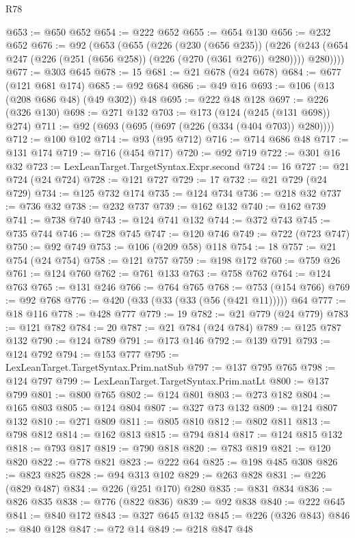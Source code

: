 \begin{lexlean}{R78}
\begin{coremodule}
@653 := @650 @652
@654 := @222 @652
@655 := @654 @130
@656 := @232 @652
@676 := @92
    (@653
      (@655
        (@226
          (@230 (@656 @235))
          (@226 (@243 (@654 @247 (@226 (@251 (@656 @258)) (@226 (@270 (@361 @276)) @280)))) @280))))
@677 := @303 @645
@678 := 15
@681 := @21 @678 (@24 @678)
@684 := @677 (@121 @681 @174)
@685 := @92 @684
@686 := @49 @16
@693 := @106 (@13 (@208 @686 @48) (@49 @302)) @48
@695 := @222 @48 @128
@697 := @226 (@326 @130)
@698 := @271 @132
@703 := @173 (@124 (@245 (@131 @698)) @274)
@711 := @92 (@693 (@695 (@697 (@226 (@334 (@404 @703)) @280))))
@712 := @100 @102
@714 := @93 (@95 @712)
@716 := @714 @686 @48
@717 := @131 @174
@719 := @716 (@454 @717)
@720 := @92 @719
@722 := @301 @16 @32
@723 := LexLeanTarget.TargetSyntax.Expr.second
@724 := 16
@727 := @21 @724 (@24 @724)
@728 := @121 @727
@729 := 17
@732 := @21 @729 (@24 @729)
@734 := @125 @732 @174
@735 := @124 @734
@736 := @218 @32
@737 := @736 @32
@738 := @232 @737
@739 := @162 @132
@740 := @162 @739
@741 := @738 @740
@743 := @124 @741 @132
@744 := @372 @743
@745 := @735 @744
@746 := @728 @745
@747 := @120 @746
@749 := @722 (@723 @747)
@750 := @92 @749
@753 := @106 (@209 @58) @118
@754 := 18
@757 := @21 @754 (@24 @754)
@758 := @121 @757
@759 := @198 @172
@760 := @759 @26
@761 := @124 @760
@762 := @761 @133
@763 := @758 @762
@764 := @124 @763
@765 := @131 @246
@766 := @764 @765
@768 := @753 (@154 @766)
@769 := @92 @768
@776 := @420 (@33 (@33 (@33 (@56 (@421 @11))))) @64
@777 := @18 @116
@778 := @428 @777
@779 := 19
@782 := @21 @779 (@24 @779)
@783 := @121 @782
@784 := 20
@787 := @21 @784 (@24 @784)
@789 := @125 @787 @132
@790 := @124 @789
@791 := @173 @146
@792 := @139 @791
@793 := @124 @792
@794 := @153 @777
@795 := LexLeanTarget.TargetSyntax.Prim.natSub
@797 := @137 @795 @765
@798 := @124 @797
@799 := LexLeanTarget.TargetSyntax.Prim.natLt
@800 := @137 @799
@801 := @800 @765
@802 := @124 @801
@803 := @273 @182
@804 := @165 @803
@805 := @124 @804
@807 := @327 @73 @132
@809 := @124 @807 @132
@810 := @271 @809
@811 := @805 @810
@812 := @802 @811
@813 := @798 @812
@814 := @162 @813
@815 := @794 @814
@817 := @124 @815 @132
@818 := @793 @817
@819 := @790 @818
@820 := @783 @819
@821 := @120 @820
@822 := @778 @821
@823 := @222 @64
@825 := @198 @485 @308
@826 := @823 @825
@828 := @94 @313 @102
@829 := @263 @828
@831 := @226 (@829 @487)
@834 := @226 (@251 @170) @280
@835 := @831 @834
@836 := @826 @835
@838 := @776 (@822 @836)
@839 := @92 @838
@840 := @222 @645
@841 := @840 @172
@843 := @327 @645 @132
@845 := @226 (@326 @843)
@846 := @840 @128
@847 := @72 @14
@849 := @218 @847 @48

\end{coremodule}
\end{lexlean}
